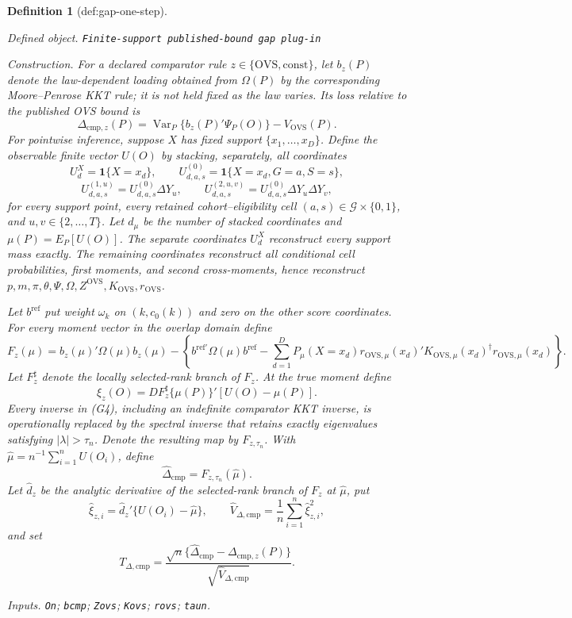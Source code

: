 \documentclass{article}
\newtheorem{definition}{Definition}
\begin{document}
\begin{definition}[def:gap-one-step]\label{def:gap-one-step}
\par\smallskip\noindent\emph{Defined object.} \texttt{Finite-\allowbreak{}support published-\allowbreak{}bound gap plug-\allowbreak{}in}
\par\smallskip\noindent\emph{Construction.} For a declared comparator rule \(z\in\{\mathrm{OVS},\mathrm{const}\}\), let \(b_z(P)\) denote the law-dependent loading obtained from \(\Omega(P)\) by the corresponding Moore--Penrose KKT rule; it is not held fixed as the law varies.  Its loss relative to the published OVS bound is
\[
\Delta_{\mathrm{cmp},z}(P)
=\operatorname{Var}_P\{b_z(P)'\Psi_P(O)\}-V_{\mathrm{OVS}}(P).
\tag{G1}
\]
For pointwise inference, suppose \(X\) has fixed support \(\{x_1,\ldots,x_D\}\).  Define the observable finite vector \(U(O)\) by stacking, separately, all coordinates
\[
U_d^X=\mathbf 1\{X=x_d\},
\qquad
U^{(0)}_{d,a,s}=\mathbf 1\{X=x_d,G=a,S=s\},
\tag{G2}
\]
\[
U^{(1,u)}_{d,a,s}=U^{(0)}_{d,a,s}\Delta Y_u,
\qquad
U^{(2,u,v)}_{d,a,s}=U^{(0)}_{d,a,s}\Delta Y_u\Delta Y_v,
\tag{G3}
\]
for every support point, every retained cohort--eligibility cell \((a,s)\in\mathcal G\times\{0,1\}\), and \(u,v\in\{2,\ldots,T\}\).  Let \(d_\mu\) be the number of stacked coordinates and \(\mu(P)=E_P[U(O)]\).  The separate coordinates \(U_d^X\) reconstruct every support mass exactly.  The remaining coordinates reconstruct all conditional cell probabilities, first moments, and second cross-moments, hence reconstruct \(p,m,\pi,\theta,\Psi,\Omega,Z^{\mathrm{OVS}},K_{\mathrm{OVS}},r_{\mathrm{OVS}}\).

Let \(b^{\mathrm{ref}}\) put weight \(\omega_k\) on \((k,c_0(k))\) and zero on the other score coordinates.  For every moment vector in the overlap domain define
\[
F_z(\mu)=b_z(\mu)'\Omega(\mu)b_z(\mu)
-\left\{b^{\mathrm{ref}\prime}\Omega(\mu)b^{\mathrm{ref}}
-\sum_{d=1}^D P_\mu(X=x_d)
r_{\mathrm{OVS},\mu}(x_d)'K_{\mathrm{OVS},\mu}(x_d)^\dagger
r_{\mathrm{OVS},\mu}(x_d)\right\}.
\tag{G4}
\]
Let \(F_z^\sharp\) denote the locally selected-rank branch of \(F_z\).  At the true moment define
\[
\xi_z(O)=DF_z^\sharp\{\mu(P)\}'[U(O)-\mu(P)].
\tag{G5}
\]
Every inverse in (G4), including an indefinite comparator KKT inverse, is operationally replaced by the spectral inverse that retains exactly eigenvalues satisfying \(|\lambda|>\tau_n\).  Denote the resulting map by \(F_{z,\tau_n}\).  With \(\widehat\mu=n^{-1}\sum_{i=1}^nU(O_i)\), define
\[
\widehat\Delta_{\mathrm{cmp}}=F_{z,\tau_n}(\widehat\mu).
\tag{G6}
\]
Let \(\widehat d_z\) be the analytic derivative of the selected-rank branch of \(F_z\) at \(\widehat\mu\), put
\[
\widehat\xi_{z,i}=\widehat d_z'\{U(O_i)-\widehat\mu\},
\qquad
\widehat V_{\Delta,\mathrm{cmp}}=\frac1n\sum_{i=1}^n\widehat\xi_{z,i}^2,
\tag{G7}
\]
and set
\[
T_{\Delta,\mathrm{cmp}}
=\frac{\sqrt n\{\widehat\Delta_{\mathrm{cmp}}-\Delta_{\mathrm{cmp},z}(P)\}}
{\sqrt{\widehat V_{\Delta,\mathrm{cmp}}}}.
\tag{G8}
\]
\par\smallskip\noindent\emph{Inputs.} \texttt{On}; \texttt{bcmp}; \texttt{Zovs}; \texttt{Kovs}; \texttt{rovs}; \texttt{taun}.
\end{definition}
\end{document}
